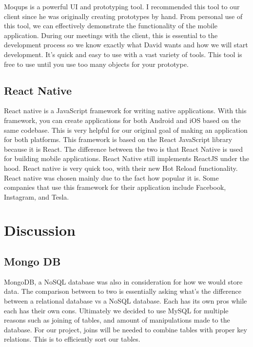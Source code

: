 \documentclass[letterpaper, 10pt,titlepage]{article}
\begin{document}
Moqups is a powerful UI and prototyping tool. I recommended this tool to our client since he was originally creating prototypes by hand. From personal use of this tool, we can effectively demonstrate the functionality of the mobile application. During our meetings with the client, this is essential to the development process so we know exactly what David wants and how we will start development. It's quick and easy to use with a vast variety of tools. This tool is free to use until you use too many objects for your prototype.

\subsection{React Native}

React native is a JavaScript framework for writing native applications. With this framework, you can create applications for both Android and iOS based on the same codebase. This is very helpful for our original goal of making an application for both platforms. This framework is based on the React JavaScript library because it is React. The difference between the two is that React Native is used for building mobile applications. React Native still implements ReactJS under the hood. React native is very quick too, with their new Hot Reload functionality. React native was chosen mainly due to the fact how popular it is. Some companies that use this framework for their application include Facebook, Instagram, and Tesla.

\vspace{0.5cm}


\section{Discussion}
\subsection{Mongo DB}

MongoDB, a NoSQL database was also in consideration for how we would store data. The comparison between to two is essentially asking what's the difference between a relational database vs a NoSQL database. Each has its own pros while each has their own cons. Ultimately we decided to use MySQL for multiple reasons such as joining of tables, and amount of manipulations made to the database. For our project, joins will be needed to combine tables with proper key relations. This is to efficiently sort our tables.
\end{document}
